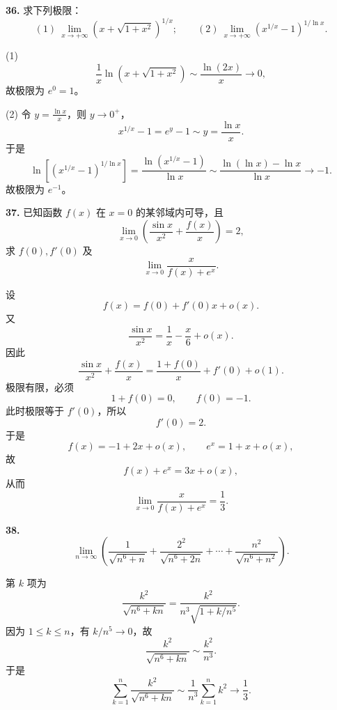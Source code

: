 \begin{problemblock}
\textbf{36.} 求下列极限：
\[
(1)\ \lim_{x\to+\infty}\left(x+\sqrt{1+x^2}\right)^{1/x};
\qquad
(2)\ \lim_{x\to+\infty}\left(x^{1/x}-1\right)^{1/\ln x}.
\]
\end{problemblock}

\begin{solutionblock}
(1)
\[
\frac1x\ln\left(x+\sqrt{1+x^2}\right)
\sim\frac{\ln(2x)}x\to0,
\]
故极限为 \(e^0=1\)。

(2) 令 \(y=\frac{\ln x}{x}\)，则 \(y\to0^+\)，
\[
x^{1/x}-1=e^y-1\sim y=\frac{\ln x}{x}.
\]
于是
\[
\ln\left[\left(x^{1/x}-1\right)^{1/\ln x}\right]
=\frac{\ln(x^{1/x}-1)}{\ln x}
\sim\frac{\ln(\ln x)-\ln x}{\ln x}\to-1.
\]
故极限为 \(e^{-1}\)。

\end{solutionblock}

\begin{problemblock}
\textbf{37.} 已知函数 \(f(x)\) 在 \(x=0\) 的某邻域内可导，且
\[
\lim_{x\to0}\left(\frac{\sin x}{x^2}+\frac{f(x)}x\right)=2,
\]
求 \(f(0),f'(0)\) 及
\[
\lim_{x\to0}\frac{x}{f(x)+e^x}.
\]
\end{problemblock}

\begin{solutionblock}
设
\[
f(x)=f(0)+f'(0)x+o(x).
\]
又
\[
\frac{\sin x}{x^2}=\frac1x-\frac{x}{6}+o(x).
\]
因此
\[
\frac{\sin x}{x^2}+\frac{f(x)}x
=\frac{1+f(0)}x+f'(0)+o(1).
\]
极限有限，必须
\[
1+f(0)=0,\qquad f(0)=-1.
\]
此时极限等于 \(f'(0)\)，所以
\[
f'(0)=2.
\]
于是
\[
f(x)=-1+2x+o(x),\qquad e^x=1+x+o(x),
\]
故
\[
f(x)+e^x=3x+o(x),
\]
从而
\[
\lim_{x\to0}\frac{x}{f(x)+e^x}=\frac13.
\]
\end{solutionblock}

\begin{problemblock}
\textbf{38.}
\[
\lim_{n\to\infty}
\left(
\frac1{\sqrt{n^6+n}}+
\frac{2^2}{\sqrt{n^6+2n}}+\cdots+
\frac{n^2}{\sqrt{n^6+n^2}}
\right).
\]
\end{problemblock}

\begin{solutionblock}
第 \(k\) 项为
\[
\frac{k^2}{\sqrt{n^6+kn}}
=\frac{k^2}{n^3\sqrt{1+k/n^5}}.
\]
因为 \(1\le k\le n\)，有 \(k/n^5\to0\)，故
\[
\frac{k^2}{\sqrt{n^6+kn}}\sim\frac{k^2}{n^3}.
\]
于是
\[
\sum_{k=1}^n\frac{k^2}{\sqrt{n^6+kn}}
\sim\frac1{n^3}\sum_{k=1}^n k^2
\to\frac13.
\]
\end{solutionblock}

